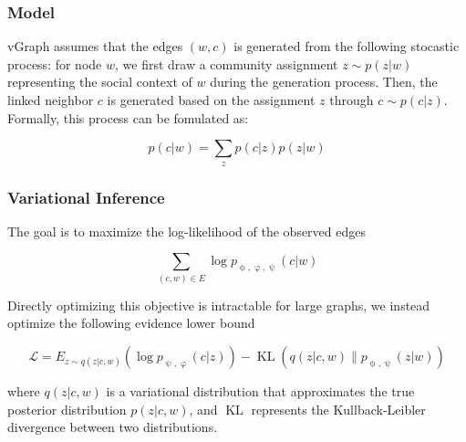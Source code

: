 \documentclass[12pt,aspectratio=169]{beamer}
\begin{document}
    \begin{frame}
        \frametitle{Model}

        vGraph assumes that the edges $(w,c)$ is generated from the following stocastic process: for node $w$, we first
        draw a community assignment $z \sim p(z|w)$ representing the social context of $w$ during the generation process.
        Then, the linked neighbor $c$ is generated based on the assignment $z$ through $c \sim p(c|z)$. Formally, this
        process can be fomulated as:

        $$ p(c|w) = \sum_{z}{p(c|z)p(z|w)} $$
    \end{frame}


    \begin{frame}
        \frametitle{Variational Inference}

        The goal is to maximize the log-likelihood of the observed edges

        $$ \sum_{(c,w)\in E}\log{}p_{\upphi,\upvarphi,\uppsi}(c|w) $$

        Directly optimizing this objective is intractable for large graphs, we instead optimize the following evidence
        lower bound

        $$ \mathcal{L} = E_{z\sim q(z|c,w)}(\log p_{\uppsi,\upvarphi}(c|z)) - \mathop{KL}(q(z|c,w) \| p_{\upphi,\uppsi}(z|w)) $$

        where $q(z|c,w)$ is a variational distribution that approximates the true posterior distribution $p(z|c,w)$, and
        $\mathop{KL(\cdot\|\cdot)}$ represents the Kullback-Leibler divergence between two distributions.
    \end{frame}
\end{document}
